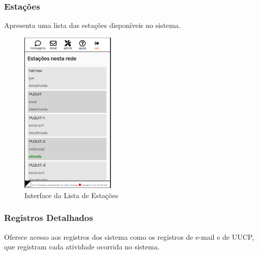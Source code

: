 \documentclass[11pt,a4paper]{article}
\begin{document}
\subsubsection{Estações} 
\label{gui_stations}

Apresenta uma lista das estações disponíveis no sistema. 

\begin{figure}[H]
    \centering
    \includegraphics[width=0.4\textwidth]{screenshots/frontend/pt_kn/stations.png}
    \caption{Interface da Lista de Estações}
    \vspace{-10pt}
    \label{fig:stations}
\end{figure} 


    
\subsubsection{Registros Detalhados}
Oferece acesso aos registros dos sistema como os registros de e-mail e de UUCP, que registram cada atividade ocorrida no sistema.
    
\end{document}
